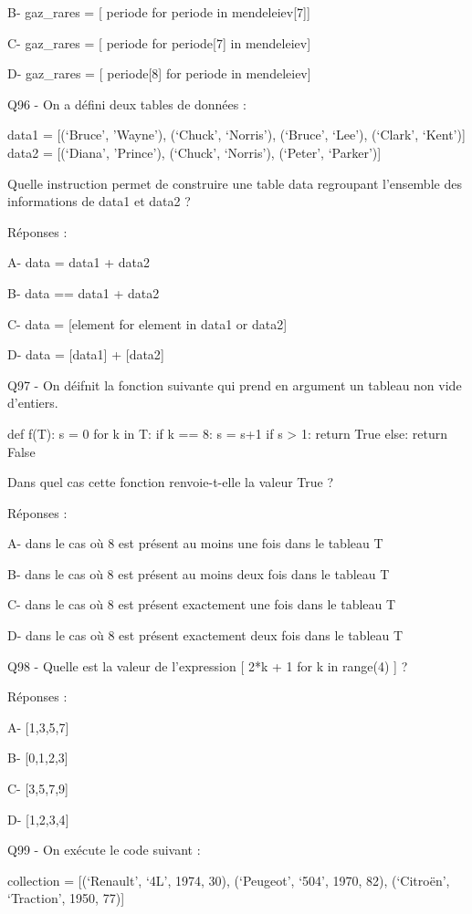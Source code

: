 \documentclass[
]{book}
\begin{document}
B- gaz\_rares = {[} periode for periode in mendeleiev{[}7{]}{]}

C- gaz\_rares = {[} periode for periode{[}7{]} in mendeleiev{]}

D- gaz\_rares = {[} periode{[}8{]} for periode in mendeleiev{]}

Q96 - On a défini deux tables de données :

data1 = {[}(`Bruce', 'Wayne'), (`Chuck', `Norris'), (`Bruce', `Lee'), (`Clark', `Kent'){]}
data2 = {[}(`Diana', 'Prince'), (`Chuck', `Norris'), (`Peter', `Parker'){]}

Quelle instruction permet de construire une table data regroupant l'ensemble des informations de data1 et data2 ?

Réponses :

A- data = data1 + data2

B- data == data1 + data2

C- data = {[}element for element in data1 or data2{]}

D- data = {[}data1{]} + {[}data2{]}

Q97 - On déifnit la fonction suivante qui prend en argument un tableau non vide d'entiers.

def f(T):
s = 0
for k in T:
if k == 8:
s = s+1
if s \textgreater{} 1:
return True
else:
return False

Dans quel cas cette fonction renvoie-t-elle la valeur True ?

Réponses :

A- dans le cas où 8 est présent au moins une fois dans le tableau T

B- dans le cas où 8 est présent au moins deux fois dans le tableau T

C- dans le cas où 8 est présent exactement une fois dans le tableau T

D- dans le cas où 8 est présent exactement deux fois dans le tableau T

Q98 - Quelle est la valeur de l'expression {[} 2*k + 1 for k in range(4) {]} ?

Réponses :

A- {[}1,3,5,7{]}

B- {[}0,1,2,3{]}

C- {[}3,5,7,9{]}

D- {[}1,2,3,4{]}

Q99 - On exécute le code suivant :

collection = {[}(`Renault', `4L', 1974, 30),
(`Peugeot', `504', 1970, 82),
(`Citroën', `Traction', 1950, 77){]}
\end{document}
